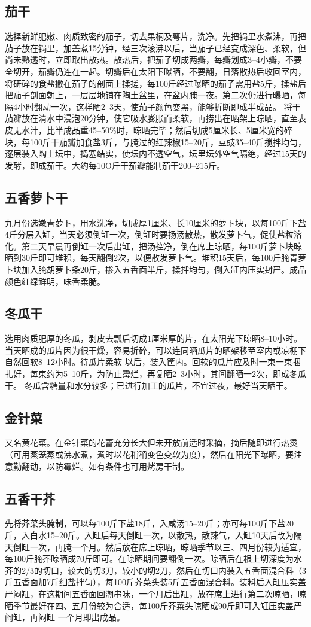 \documentclass{ctexbook}
\begin{document}
\subsection{茄干}
选择新鲜肥嫩、肉质致密的茄子，切去果柄及萼片，洗净。先把锅里水煮沸，再把茄子放在锅里，加盖煮15分钟，经三次滚沸以后，当茄子已经变成深色、柔软，但尚未熟透时，立即取出散热。散热后，把茄子切成两瓣，每瓣划成3--4小瓣，不要全切开，茄瓣仍连在一起。切瓣后在太阳下曝晒，不要翻，日落散热后收回室内，将研碎的食盐撒在茄子的剖面上揉搓，每100斤经过曝晒的茄子需用盐5斤，揉盐后把茄子剖面朝上，一层层地铺在陶土盆里，在盆内腌一夜。第二次仍进行曝晒，每隔4小时翻动一次，这样晒2--3天，使茄子颜色变黑，能够折断即成半成品。
将干茄瓣放在清水中浸泡20分钟，使它吸水膨胀而柔软，再捞出在晒架上晾晒，直至表皮无水汁，比半成品重45--50\%时，晾晒完毕；然后切成5厘米长、5厘米宽的碎块，每100斤干茄瓣加食盐3斤，与腌过的红辣椒15--20斤，豆豉35--40斤搅拌均匀，逐层装入陶土坛中，捣塞结实，使坛内不透空气，坛里坛外空气隔绝，经过15天的发酵，即成茄干。大约每10O斤干茄瓣能制茄干200--215斤。
\subsection{五香萝卜干}
九月份选嫩青萝卜，用水洗净，切成厚1厘米、长10厘米的萝卜块，以每100斤下盐4斤分层入缸，当天必须倒缸一次，倒缸时要扬汤散热，散发萝卜气，促使盐粒溶化。第二天早晨再倒缸一次后出缸，把汤控净，倒在席上晾晒，每100斤萝卜块晾晒到30斤即可堆积，每天翻倒2次，以便散发萝卜气。堆积15天后，每100斤腌青萝卜块加入腌胡萝卜条20斤，掺入五香面半斤，揉拌均匀，倒入缸内压实封严。成品颜色红绿鲜明，味香柔脆。
\subsection{冬瓜干}
选用肉质肥厚的冬瓜，剥皮去瓢后切成1厘米厚的片，在太阳光下晾晒8--10小时。当天晒成的瓜片因为很干燥，容易折碎，可以连同晒瓜片的晒架移至室内或凉棚下自然回软8--12小时。待瓜片柔软
以后，装入筐内。回软的瓜片应及时一束一束捆扎好，每束约为5--10斤，为防止霉烂，再复晒2--3小时，其间翻晒一2次，即成冬瓜干。
冬瓜含糖量和水分较多；已进行加工的瓜片，不宜过夜，最好当天晒干。
\subsection{金针菜}
又名黄花菜。在金针菜的花蕾充分长大但未开放前适时采摘，摘后随即进行热烫（可用蒸笼蒸或沸水煮，煮时以花稍稍变色变软为度），然后在阳光下曝晒，要注意勤翻动，以防霉烂。如有条件也可用烤房干制。
\subsection{五香干芥}
先将芥菜头腌制，可以每100斤下盐18斤，入咸汤15--20斤；亦可每100斤下盐20斤，入白水15--20斤。入缸后每天倒缸一次，以散热，散辣气，入缸10天后改为隔天倒缸一次，再腌一个月。然后放在席上晾晒，晾晒季节以三、四月份较为适宜，每100斤腌芥晾晒成70斤即可。在晾晒期间要翻倒一次。晾晒后在根上切深度为水芥的2/3的切口，较大的切3刀，较小的切2刀，然后在切口内装入五香面混合料（3斤五香面加7斤细盐拌匀），每100斤芥菜头装5斤五香面混合料。装料后入缸压实盖严闷缸，在这期间五香面回潮串味，一个月后出缸，放在席上进行第二次晾晒，晾晒季节最好在四、五月份较为合适，每100斤芥菜头晾晒成90斤即可入缸压实盖严闷缸，再闷缸
一个月即出成品。
\end{document}
